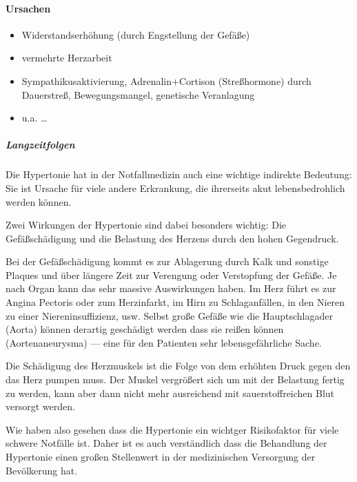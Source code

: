 \paragraph{Ursachen}

\begin{itemize}
    \item Widerstandserhöhung (durch Engstellung der Gefäße)
    \item vermehrte Herzarbeit
    \item Sympathikusaktivierung, Adrenalin+Cortison (Streßhormone) durch
    Dauerstreß,  Bewegungsmangel, genetische Veranlagung
    \item u.a. \ldots  
\end{itemize}

\subparagraph{Langzeitfolgen}

Die Hypertonie hat in der Notfallmedizin auch eine wichtige
indirekte Bedeutung: Sie ist Ursache für viele andere
Erkrankung, die ihrerseits akut lebensbedrohlich werden
können. 

Zwei Wirkungen der Hypertonie sind dabei besonders wichtig:
Die Gefäßschädigung und die Belastung des Herzens durch
den hohen Gegendruck. 

Bei der Gefäßschädigung kommt es zur Ablagerung durch Kalk
und sonstige Plaques und über längere Zeit zur Verengung
oder Verstopfung der Gefäße. Je nach Organ kann das sehr
massive Auswirkungen haben. Im Herz führt es zur Angina
Pectoris oder zum Herzinfarkt, im Hirn zu Schlaganfällen, in
den Nieren zu einer Niereninsuffizienz, usw. Selbst große
Gefäße wie die Hauptschlagader (Aorta) können derartig
geschädigt werden dass sie reißen können (Aortenaneurysma) --- eine
für den Patienten sehr lebensgefährliche Sache. 

Die Schädigung des Herzmuskels ist die Folge von dem
erhöhten Druck gegen den das Herz pumpen muss. Der Muskel
vergrößert sich um mit der Belastung fertig zu werden, kann
aber dann nicht mehr ausreichend mit sauerstoffreichen
Blut versorgt werden. 

Wie haben also gesehen dass die Hypertonie ein wichtger
Risikofaktor für viele schwere Notfälle ist. Daher ist es
auch verständlich dass die Behandlung der Hypertonie einen
großen Stellenwert in der medizinischen Versorgung der
Bevölkerung hat. 

